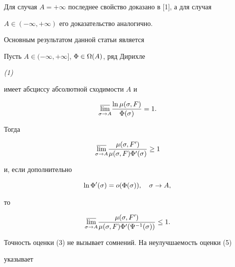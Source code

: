 Для случая $A=+\infty$ последнее свойство доказано в [1], а для случая


$A\in(-\infty,+\infty)$ его доказательство аналогично.





Основным результатом данной статьи является 





\begin{thm} Пусть $A\in(-\infty,+\infty]$, $\Phi\in\Omega(A)$, ряд Дирихле


{\em (1)}


имеет абсциссу абсолютной сходимости $A$ и


\begin{equation}


\underset{\s\to A}{\varlimsup}{}\frac{\ln\mu(\s,F)}{\Phi(\s)}=1.


\end{equation}


Тогда


\begin{equation}


\underset{\s\to A}{\varlimsup}{}\frac{\mu(\s,F')}{\mu(\s,F)\Phi'(\s)}\ge 1


\end{equation}


и, если дополнительно


\begin{equation}


\ln\Phi'(\s)=o(\Phi(\s)),\quad \s\to A,


\end{equation}


то 


\begin{equation}


\underset{\s\to A}{\varlimsup}{}\frac{\mu(\s,F')}


{\mu(\s,F)\Phi'(\F^{-1}(\s))}\le 1.


\end{equation}


\end{thm}





Точность оценки (3) не вызывает сомнений. На неулучшаемость оценки (5) 


указывает





